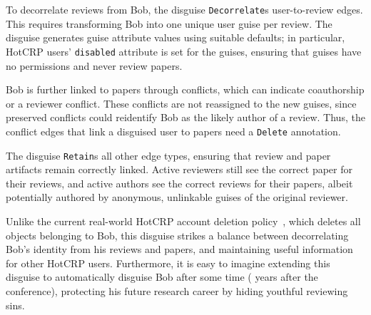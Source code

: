 %
To decorrelate reviews from Bob, the disguise \texttt{Decorrelate}s user-to-review edges.
%
This requires transforming Bob into one unique user guise per review.
%
The disguise generates guise attribute values using suitable defaults;
%
in particular, HotCRP users' \texttt{disabled} attribute is set for the guises,
ensuring that guises have no permissions and never review papers.
%

%
Bob is further linked to papers through conflicts, which can indicate coauthorship or a
reviewer conflict.
%
These conflicts are not reassigned to the new guises, since preserved
conflicts could reidentify Bob as the likely author of a review. Thus, the
conflict edges that link a disguised user to papers need a \texttt{Delete} annotation.
%

The disguise \texttt{Retain}s all other edge types, ensuring that review and paper
artifacts remain correctly linked. Active reviewers still see the correct paper for their reviews,
and active authors see the correct reviews for their papers, albeit potentially authored by
anonymous, unlinkable guises of the original reviewer.
%
%

%
Unlike the current real-world HotCRP account deletion policy~\cite{hotcrp:privacy}, which
deletes all objects belonging to Bob, this disguise strikes a balance between decorrelating
Bob's identity from his reviews and papers, and maintaining useful information for other
HotCRP users.
%
Furthermore, it is easy to imagine extending this disguise to automatically disguise Bob
after some time ( years after the conference), protecting his future research career
by hiding youthful reviewing sins.
